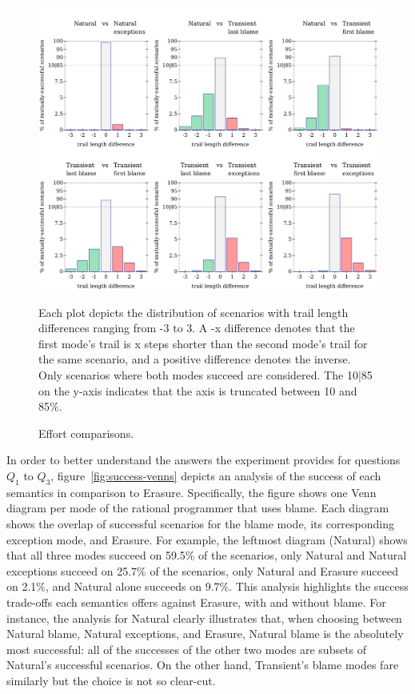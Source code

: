 \begin{figure}
  \centering
  \includegraphics[width=\textwidth]{./plots/bt-length-comparisons}

  \vspace{1em}
  \begin{minipage}{0.95\textwidth}
  Each plot depicts the distribution of scenarios with trail length
    differences ranging from -3 to 3.  A -x difference denotes that
    the first mode's trail is x steps shorter than the second mode's
    trail for the same scenario, and a positive difference denotes the
    inverse.  Only scenarios where both modes succeed are considered.  The
    10|85 on the y-axis indicates that the axis is truncated between 10
    and 85\%.
  \end{minipage}

  \caption{Effort comparisons.}
  \label{fig:effort-comparisons}
\end{figure}

In order to better understand the answers the experiment provides for
questions $Q_1$ to $Q_3$, figure~\ref{fig:success-venns} depicts an
analysis of the success of each semantics in comparison to Erasure.
Specifically, the figure shows one Venn diagram per mode of the rational
programmer that uses blame.  Each diagram shows the overlap of successful
scenarios for  the blame mode, its corresponding exception mode, and Erasure.  For
example, the leftmost diagram (Natural) shows that all three modes
succeed on 59.5\% of the  scenarios, only Natural and Natural exceptions
succeed on 25.7\% of the scenarios, only Natural and Erasure succeed on
2.1\%, and Natural alone succeeds on 9.7\%.  This analysis highlights
the success trade-offs each semantics offers against Erasure, with and
without blame. For instance, the analysis
for Natural clearly illustrates that, when choosing between Natural blame,
Natural exceptions, and Erasure, Natural blame is the absolutely most
successful: all of the successes of the other two modes are subsets of
Natural's successful scenarios.  On the other hand, Transient's blame
modes fare similarly but the choice is not so clear-cut.


